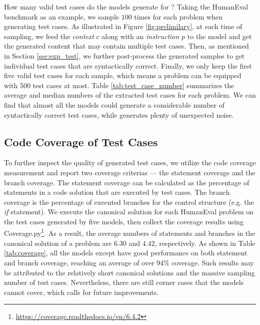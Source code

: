 How many valid test cases do the models generate for \ours? Taking the HumanEval benchmark as an example, we sample $100$ times for each problem when generating test cases. As illustrated in Figure \ref{fig:prelimilary}, at each time of sampling, we feed the \emph{context} $c$ along with an \emph{instruction} $p$ to the model and get the generated content that may contain multiple test cases. Then, as mentioned in Section \ref{sec:exp_test}, we further post-process the generated samples to get individual test cases that are syntactically correct. Finally, we only keep the first five valid test cases for each sample, which means a problem can be equipped with $500$ test cases at most. Table \ref{tab:test_case_number} summarizes the average and median numbers of the extracted test cases for each problem. We can find that almost all the models could generate a considerable number of syntactically correct test cases, while \codegen generates plenty of unexpected noise.

\subsection{Code Coverage of Test Cases}
\label{appendix_coverage}
To further inspect the quality of generated test cases, we utilize the code coverage measurement and report two coverage criterias --- the statement coverage and the branch coverage. The statement coverage can be calculated as the percentage of statements in a code solution that are executed by test cases. The branch coverage is the percentage of executed branches for the control structure (e.g. the \textit{if} statement). We execute the canonical solution for each HumanEval problem on the test cases generated by five models, then collect the coverage results using Coverage.py\footnote{\url{https://coverage.readthedocs.io/en/6.4.2}}. As a result, the average numbers of statements and branches in the canonical solution of a problem are ${6.30}$ and ${4.42}$, respectively. As shown in Table \ref{tab:coverage}, all the models except \codegen have good performance on both statement and branch coverage, reaching an average of over $94\%$ coverage. Such results may be attributed to the relatively short canonical solutions and the massive sampling number of test cases. Nevertheless, there are still corner cases that the models cannot cover, which calls for future improvements.


